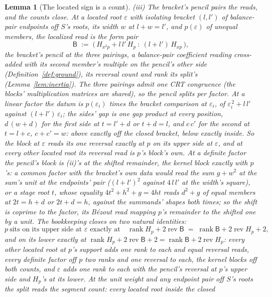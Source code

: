 \documentclass[11pt]{article}
\newtheorem{lemma}{Lemma}
\theoremstyle{definition}
\begin{document}
\begin{lemma}[The located sign is a count]
\emph{(iii) The bracket's pencil pairs the reads, and the counts
close.} At a located root $\varepsilon$ with isolating bracket
$(l,l')$ of balance-pair endpoints off $S$'s roots, its width $w$ at
$l+w=l'$, and $p(\varepsilon)$ of unequal members, the localized read is the form
pair
\[
\mathsf B\;:=\;\big(\,H_{x^2p}+l\,l'\,H_p\ :\ (l+l')\,H_{xp}\,\big),
\]
the bracket's pencil at the three pairings, a balance-pair
coefficient reading cross-added with its second member's multiple on
the pencil's other side (Definition~\ref{def:ground}), its reversal
count and rank its split's (Lemma~\ref{lem:inertia}). The three pairings admit
one CRT congruence (the blocks' multiplication matrices are shared),
so the pencil splits per factor. At a linear factor the datum is
$p(\varepsilon_i)$ times the \emph{bracket comparison} at
$\varepsilon_i$, of $\varepsilon_i^{\,2}+l\,l'$ against
$(l+l')\,\varepsilon_i$; the sides' gap is one gap product at every
position, $d\,(w+d)$ for the first side at $t=l'+d$ or $t+d=l$, and
$c\,c'$ for the second at $t=l+c$, $c+c'=w$: above exactly off the
closed bracket, below exactly inside. So the block at $\varepsilon$
reads its one reversal exactly at $p$ on its upper side at
$\varepsilon$, and
at every other located root its reversal read is $p$'s block's own.
At a definite factor the pencil's block is (ii)'s at the shifted
remainder, the kernel block exactly with $p$'s: a common factor with the
bracket's own data would read the sum $g+w^2$ at the sum's unit
at the endpoints' pair
($(l+l')^2$ against $4\,l\,l'$ at the width's square), or a stage
root $t$, whose equality $4t^2+h^2+g=4ht$ reads $d^2+g$ of equal
members at $2t=h+d$
or $2t+d=h$, against the summands' shapes both times; so the shift
is coprime to the factor, its B\'ezout read mapping $p$'s remainder
to the shifted one by a unit. The
bookkeeping closes on two natural identities:
\[
p\ \text{sits on its upper side at $\varepsilon$ exactly at}\quad
\operatorname{rank}H_p+2\operatorname{rev}\mathsf B
\;=\;\operatorname{rank}\mathsf B+2\operatorname{rev}H_p+2 ,
\]
and on its lower exactly at
$\operatorname{rank}H_p+2\operatorname{rev}\mathsf B+2
=\operatorname{rank}\mathsf B+2\operatorname{rev}H_p$: every other
located root at $p$'s support adds one rank to each and equal
reversal reads, every definite factor off $p$ two ranks and one
reversal to each, the kernel blocks off both counts, and $\varepsilon$
adds one rank to each with the pencil's reversal at $p$'s upper side
and $H_p$'s at its lower. At the unit weight and any endpoint pair off $S$'s roots the split
reads the \emph{segment count}: every located root inside the closed

\end{lemma}
\end{document}
